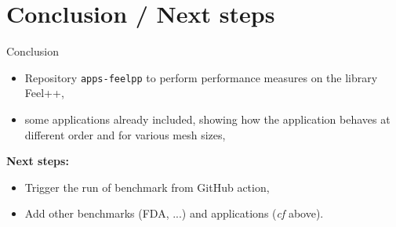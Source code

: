 \documentclass[aspectratio=169]{beamer}
\begin{document}
\section{Conclusion / Next steps}

\begin{frame}{Conclusion}

  \begin{itemize}
    \item Repository \texttt{apps-feelpp} to perform performance measures on the library Feel++,
    \item some applications already included, showing how the application behaves at different order and for various mesh sizes,
  \end{itemize}



  \pause

  \textbf{Next steps:}
  \begin{itemize}
    \item Trigger the run of benchmark from GitHub action,
    \item Add other benchmarks (FDA, ...) and applications (\emph{cf} above).
  \end{itemize}


\end{frame}
\end{document}
